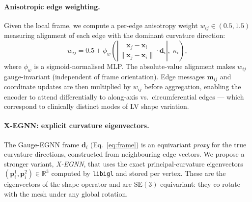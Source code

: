 \documentclass{article}
\newcommand{\R}{\mathbb{R}}
\newcommand{\SE}{\mathrm{SE}(3)}
\begin{document}
\paragraph{Anisotropic edge weighting.}
Given the local frame, we compute a per-edge anisotropy weight
$w_{ij} \in (0.5, 1.5)$ measuring alignment of each edge with the dominant
curvature direction:
\begin{equation}
    w_{ij} = 0.5 + \phi_w\!\left(
        \left|\frac{\mathbf{x}_j - \mathbf{x}_i}{\|\mathbf{x}_j - \mathbf{x}_i\|}
        \cdot \mathbf{d}_i\right|,\; \kappa_i
    \right),
    \label{eq:aniso_weight}
\end{equation}
where $\phi_w$ is a sigmoid-normalised MLP.
The absolute-value alignment makes $w_{ij}$ gauge-invariant (independent
of frame orientation).
Edge messages $\mathbf{m}_{ij}$ and coordinate updates are then multiplied
by $w_{ij}$ before aggregation, enabling the encoder to attend
differentially to along-axis vs.\ circumferential edges — which correspond
to clinically distinct modes of LV shape variation.

\paragraph{X-EGNN: explicit curvature eigenvectors.}
The Gauge-EGNN frame $\mathbf{d}_i$ (Eq.~\ref{eq:frame}) is an equivariant
\emph{proxy} for the true curvature directions, constructed from neighbouring
edge vectors.
We propose a stronger variant, \emph{X-EGNN}, that uses the exact
principal-curvature eigenvectors $(\mathbf{p}^1_i, \mathbf{p}^2_i) \in \R^3$
computed by \texttt{libigl} and stored per vertex.
These are the eigenvectors of the shape operator and are $\SE$-equivariant:
they co-rotate with the mesh under any global rotation.
\end{document}
